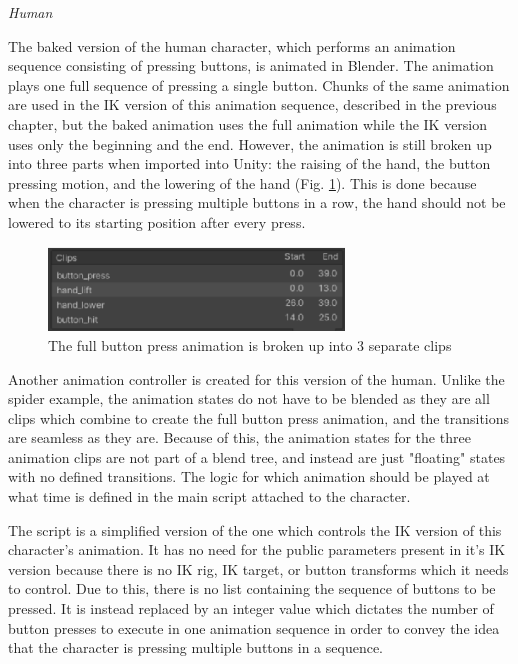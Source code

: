 \noindent\textit{Human}

The baked version of the human character, which performs an animation sequence
consisting of pressing buttons, is animated in Blender. The animation plays one
full sequence of pressing a single button. Chunks of the same animation are used
in the IK version of this animation sequence, described in the previous chapter,
but the baked animation uses the full animation while the IK version uses only
the beginning and the end. However, the animation is still broken up into three
parts when imported into Unity: the raising of the hand, the button pressing
motion, and the lowering of the hand (Fig. \ref{fig:bp_clips}). This is done
because when the character is pressing multiple buttons in a row, the hand
should not be lowered to its starting position after every press.

\begin{figure}[h!]
    \centering
    \captionsetup{justification=centering}
    \includegraphics[width=0.7\textwidth]{grafika/bp_clips.eps}
    \caption{The full button press animation is broken up into 3 separate clips}
    \label{fig:bp_clips}
\end{figure}

Another animation controller is created for this version of the human. Unlike
the spider example, the animation states do not have to be blended as they are
all clips which combine to create the full button press animation, and the
transitions are seamless as they are. Because of this, the animation states for
the three animation clips are not part of a blend tree, and instead are just
"floating" states with no defined transitions. The logic for which animation
should be played at what time is defined in the main script attached to the
character. 

The script is a simplified version of the one which controls the IK version of
this character's animation. It has no need for the public parameters present in
it's IK version because there is no IK rig, IK target, or button transforms
which it needs to control. Due to this, there is no list containing the sequence
of buttons to be pressed. It is instead replaced by an integer value which
dictates the number of button presses to execute in one animation sequence in
order to convey the idea that the character is pressing multiple buttons in
a sequence. 

